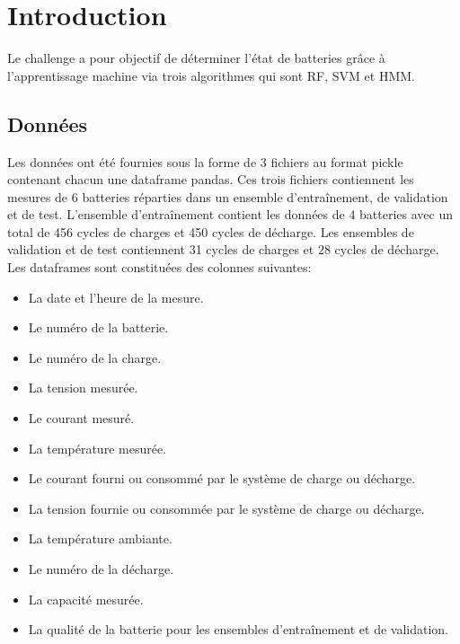 \chapter{Introduction}
Le challenge a pour objectif de déterminer l'état de batteries grâce à l'apprentissage machine via trois algorithmes qui sont \ac{RF}, \ac{SVM} et \ac{HMM}.

\section{Données}
Les données ont été fournies sous la forme de 3 fichiers au format pickle contenant chacun une dataframe pandas.
Ces trois fichiers contiennent les mesures de 6 batteries réparties dans un ensemble d'entraînement, de validation et de test.\newline
L'ensemble d'entraînement contient les données de 4 batteries avec un total de 456 cycles de charges et 450 cycles de décharge. Les ensembles de validation et de test contiennent 31 cycles de charges et 28 cycles de décharge.\newline
Les dataframes sont constituées des colonnes suivantes:
\begin{itemize}
    \item La date et l'heure de la mesure.
    \item Le numéro de la batterie.
    \item Le numéro de la charge.
    \item La tension mesurée.
    \item Le courant mesuré.
    \item La température mesurée.
    \item Le courant fourni ou consommé par le système de charge ou décharge.
    \item La tension fournie ou consommée par le système de charge ou décharge.
    \item La température ambiante.
    \item Le numéro de la décharge.
    \item La capacité mesurée.
    \item La qualité de la batterie pour les ensembles d'entraînement et de validation.
\end{itemize}